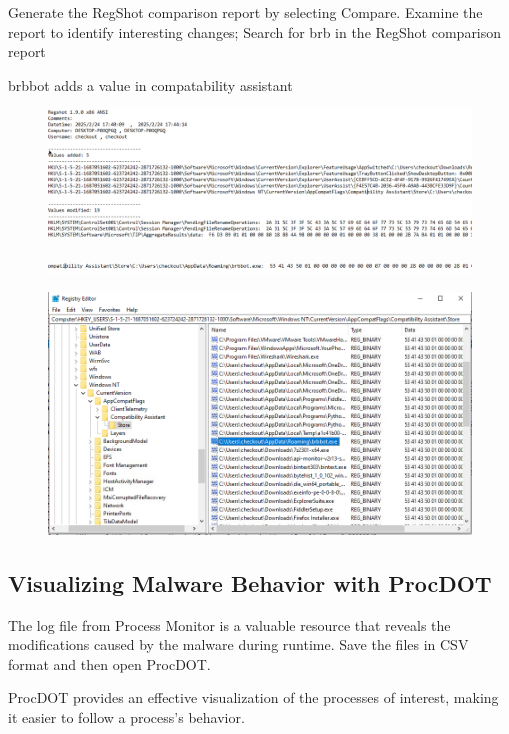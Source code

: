 \documentclass[]{project_plan}
\begin{document}
Generate the RegShot comparison report by selecting Compare. Examine
the report to identify interesting changes; Search for brb in the
RegShot comparison report

brbbot adds a value in compatability assistant
\begin{figure}[H]
  \centering
  \includegraphics[width=\linewidth]{brbot regshot.PNG}
\end{figure}
\begin{figure}[H]
  \centering
  \includegraphics[width=\linewidth]{brbot regshot 2.PNG}
\end{figure}
\begin{figure}[H]
  \centering
  \includegraphics[width=\linewidth]{brbot regshot 3.PNG}
\end{figure}

\subsection{Visualizing Malware Behavior with ProcDOT}

The log file from Process Monitor is a valuable resource that reveals the
modifications caused by the malware during runtime. Save the files in CSV
format and then open ProcDOT.

ProcDOT provides an effective visualization of the processes of interest,
making it easier to follow a process’s behavior.
\end{document}
